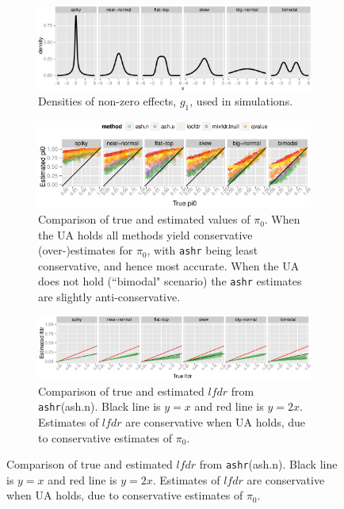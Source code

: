 \documentclass[11pt]{article}
\def\lfdr{\textit{lfdr}}
\def\ashr{{\tt ashr}\xspace}
\begin{document}
\begin{figure} 
\begin{center}
\begin{subfigure}{\textwidth}
	\includegraphics[width=\textwidth]{../analysis/figure/plot_egdens.Rmd/scenario_density-1.pdf} 
	\caption{Densities of non-zero effects, $g_1$, used in simulations.} \label{fig:altdens}
\end{subfigure}
\begin{subfigure}{\textwidth}
\includegraphics[width=\textwidth]{../analysis/figure/plot_pi0est.Rmd/plot_pi0est-1.pdf} 
\caption{Comparison of true and estimated values of $\pi_0$. When the UA holds all methods yield conservative (over-)estimates for $\pi_0$, with \ashr being least conservative, and hence most accurate. When the UA does not hold (``bimodal" scenario) the \ashr estimates are slightly anti-conservative.} \label{fig:pi0sims}
\end{subfigure}
\begin{subfigure}{\textwidth}
\includegraphics[width=\textwidth]{../analysis/figure/plot_lfsr.Rmd/plot_lfdr-1.pdf} 
\caption{Comparison of true and estimated $\lfdr$ from \ashr (ash.n). Black line is $y=x$ and red line is $y=2x$. Estimates of $\lfdr$ are conservative when UA holds, due to conservative estimates of $\pi_0$.} \label{fig:lfdr}
\end{subfigure}

\end{center}
\end{figure}
\end{document}

